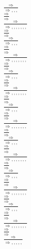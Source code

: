 \documentclass[11pt]{article}
\begin{document}
\begin{center}
\bigskip
\\$\frac{\Rightarrow }{\Rightarrow , , , }$
\bigskip
\\$\frac{\Rightarrow }{\Rightarrow }$
\bigskip
\\$\frac{\Rightarrow }{\Rightarrow , , , , , , , }$
\bigskip
\\$\frac{\Rightarrow }{\Rightarrow }$
\bigskip
\\$\frac{\Rightarrow }{\Rightarrow , , , }$
\bigskip
\\$\frac{\Rightarrow }{\Rightarrow }$
\bigskip
\\$\frac{\Rightarrow }{\Rightarrow , , , , , , , }$
\bigskip
\\$\frac{\Rightarrow }{\Rightarrow }$
\bigskip
\\$\frac{\Rightarrow }{\Rightarrow , , , }$
\bigskip
\\$\frac{\Rightarrow }{\Rightarrow }$
\bigskip
\\$\frac{\Rightarrow }{\Rightarrow , , , , , , , }$
\bigskip
\\$\frac{\Rightarrow }{\Rightarrow }$
\bigskip
\\$\frac{\Rightarrow }{\Rightarrow , , , }$
\bigskip
\\$\frac{\Rightarrow }{\Rightarrow }$
\bigskip
\\$\frac{\Rightarrow }{\Rightarrow , , , , , , , }$
\bigskip
\\$\frac{\Rightarrow }{\Rightarrow }$
\bigskip
\\$\frac{\Rightarrow }{\Rightarrow , , , }$
\bigskip
\\$\frac{\Rightarrow }{\Rightarrow }$
\bigskip
\\$\frac{\Rightarrow }{\Rightarrow , , , , , , , }$
\bigskip
\\$\frac{\Rightarrow }{\Rightarrow }$
\bigskip
\\$\frac{\Rightarrow }{\Rightarrow , , , }$
\bigskip
\\$\frac{\Rightarrow }{\Rightarrow }$
\bigskip
\\$\frac{\Rightarrow }{\Rightarrow , , , , , , , }$
\bigskip
\\$\frac{\Rightarrow }{\Rightarrow }$
\bigskip
\\$\frac{\Rightarrow }{\Rightarrow , , , }$
\bigskip
\\$\frac{\Rightarrow }{\Rightarrow }$
\bigskip
\\$\frac{\Rightarrow }{\Rightarrow , , , , , , , }$
\bigskip
\\$\frac{\Rightarrow }{\Rightarrow }$
\bigskip
\\$\frac{\Rightarrow }{\Rightarrow , , , , , }$

\end{center}
\end{document}

